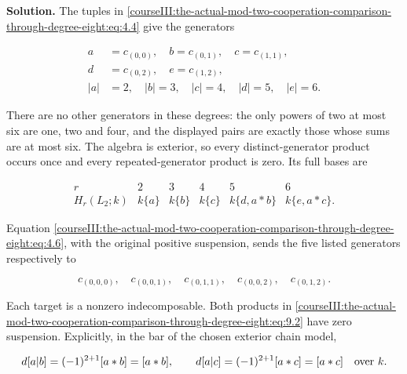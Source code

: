 \textbf{Solution.} The tuples in \eqref{courseIII:the-actual-mod-two-cooperation-comparison-through-degree-eight:eq:4.4} give the generators

\begin{equation}
\begin{aligned}
a&=c_{(0,0)},\quad b=c_{(0,1)},\quad c=c_{(1,1)},\\
d&=c_{(0,2)},\quad e=c_{(1,2)},\\
|a|&=2,\quad |b|=3,\quad |c|=4,\quad |d|=5,\quad |e|=6.
\end{aligned}
\label{courseIII:the-actual-mod-two-cooperation-comparison-through-degree-eight:eq:9.1}
\end{equation}

There are no other generators in these degrees: the only powers of two at most six are one, two and four, and the displayed pairs are exactly those whose sums are at most six. The algebra is exterior, so every distinct-generator product occurs once and every repeated-generator product is zero. Its full bases are

\begin{equation}
\begin{array}{c|ccccc}
r&2&3&4&5&6\\\hline
H_r(L_2;k)&k\{a\}&k\{b\}&k\{c\}&k\{d,a\ast b\}&k\{e,a\ast c\}.
\end{array}
\label{courseIII:the-actual-mod-two-cooperation-comparison-through-degree-eight:eq:9.2}
\end{equation}

Equation \eqref{courseIII:the-actual-mod-two-cooperation-comparison-through-degree-eight:eq:4.6}, with the original positive suspension, sends the five listed generators respectively to

\begin{equation}
c_{(0,0,0)},\quad c_{(0,0,1)},\quad c_{(0,1,1)},\quad
c_{(0,0,2)},\quad c_{(0,1,2)}.
\label{courseIII:the-actual-mod-two-cooperation-comparison-through-degree-eight:eq:9.3}
\end{equation}

Each target is a nonzero indecomposable. Both products in \eqref{courseIII:the-actual-mod-two-cooperation-comparison-through-degree-eight:eq:9.2} have zero suspension. Explicitly, in the bar of the chosen exterior chain model,

\begin{equation}
d[a|b]=(-1)^{2+1}[a\ast b]=[a\ast b],\qquad
d[a|c]=(-1)^{2+1}[a\ast c]=[a\ast c]
\quad\hbox{over }k.
\label{courseIII:the-actual-mod-two-cooperation-comparison-through-degree-eight:eq:9.4}
\end{equation}

